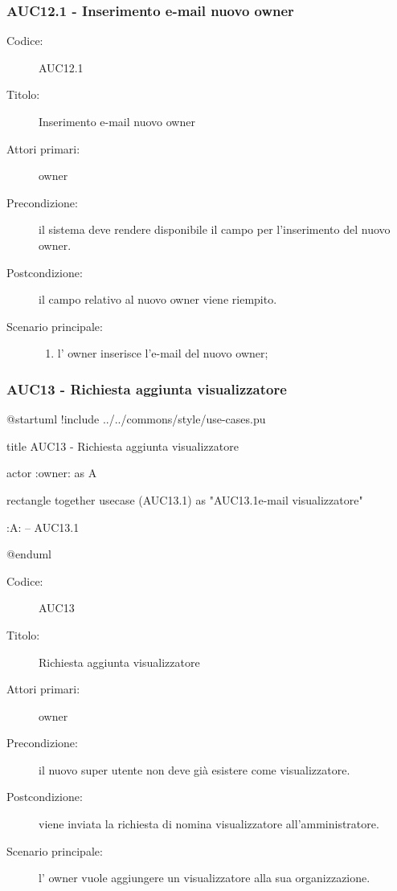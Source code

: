\documentclass[casi-duso]{subfiles}
\begin{document}
\subsubsection{AUC12.1 - Inserimento e-mail nuovo owner}%
\label{subsub:AUC12.1}
\begin{description}
  \item[Codice:] AUC12.1
  \item[Titolo:] Inserimento e-mail nuovo owner
  \item[Attori primari:] owner
  \item[Precondizione:] il sistema deve rendere disponibile il campo per l'inserimento del nuovo owner.
  \item[Postcondizione:] il campo relativo al nuovo owner viene riempito.
  \item[Scenario principale:] 
  \begin{enumerate}
    \item l' owner inserisce l'e-mail del nuovo owner;
  \end{enumerate}
\end{description}

\subsubsection{AUC13 - Richiesta aggiunta visualizzatore}%
\label{subsub:AUC13}

\begin{plantuml}
@startuml
!include ../../commons/style/use-cases.pu

title AUC13 - Richiesta aggiunta visualizzatore

actor :owner: as A

rectangle {
  together {
    usecase (AUC13.1) as "AUC13.1\nInserimento e-mail visualizzatore"
  }
}

:A: -- AUC13.1

@enduml
\end{plantuml}

\begin{description}
  \item[Codice:] AUC13
  \item[Titolo:] Richiesta aggiunta visualizzatore
  \item[Attori primari:] owner
  \item[Precondizione:] il nuovo super utente non deve già esistere come visualizzatore.
  \item[Postcondizione:] viene inviata la richiesta di nomina visualizzatore all'amministratore.
  \item[Scenario principale:] l' owner vuole aggiungere un visualizzatore alla sua organizzazione.
\end{description}
\end{document}
